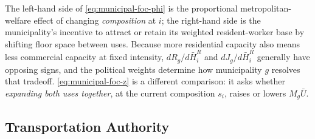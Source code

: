 \documentclass[12pt, a4paper]{article}
\theoremstyle{definition}
\theoremstyle{remark}
\begin{document}
The left-hand side of \eqref{eq:municipal-foc-phi} is the proportional metropolitan-welfare effect of changing \emph{composition} at $i$; the right-hand side is the municipality's incentive to attract or retain its weighted resident-worker base by shifting floor space between uses. Because more residential capacity also means less commercial capacity at fixed intensity, $dR_g/d\bar H_i^R$ and $dJ_g/d\bar H_i^R$ generally have opposing signs, and the political weights determine how municipality $g$ resolves that tradeoff. \eqref{eq:municipal-foc-z} is a different comparison: it asks whether \emph{expanding both uses together}, at the current composition $s_i$, raises or lowers $M_g\bar U$.

\subsection{Transportation Authority}
\end{document}
